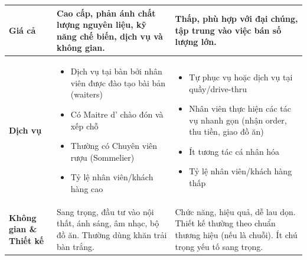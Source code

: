 \begin{longtable}{| m{3.5cm} | >{\RaggedRight}m{6.5cm} | >{\RaggedRight}m{6.5cm} |}
	\hline
	\textbf{Giá cả}                      & Cao cấp, phản ánh chất lượng nguyên liệu, kỹ năng chế biến, dịch vụ và không gian.                                                                                                                                                                                                      & Thấp, phù hợp với đại chúng, tập trung vào việc bán số lượng lớn.                                                                                                                                                                                                               \\
	\hline
	\textbf{Dịch vụ}                     & \begin{itemize} \item Dịch vụ tại bàn bởi nhân viên được đào tạo bài bản (waiters) \item Có Maitre d' chào đón và xếp chỗ \item Thường có Chuyên viên rượu (Sommelier) \item Tỷ lệ nhân viên/khách hàng cao \end{itemize}                                                               & \begin{itemize} \item Tự phục vụ hoặc dịch vụ tại quầy/drive-thru \item Nhân viên thực hiện các tác vụ nhanh gọn (nhận order, thu tiền, giao đồ ăn) \item Ít tương tác cá nhân hóa \item Tỷ lệ nhân viên/khách hàng thấp \end{itemize}                                          \\
	\hline
	\textbf{Không gian \& Thiết kế}      & Sang trọng, đầu tư vào nội thất, ánh sáng, âm nhạc, bộ đồ ăn. Thường dùng khăn trải bàn trắng.                                                                                                                                                                                          & Chức năng, hiệu quả, dễ lau dọn. Thiết kế thường theo chuẩn thương hiệu (nếu là chuỗi). Ít chú trọng yếu tố sang trọng.                                                                                                                                                         \\
	\hline

\end{longtable}
